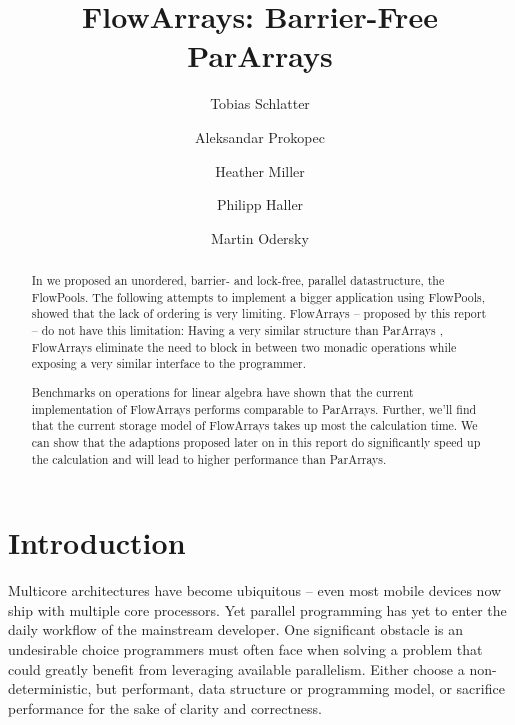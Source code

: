 \documentclass[runningheads,a4paper,fleqn]{llncs}
\begin{document}
\title{FlowArrays: Barrier-Free ParArrays}
\author{Tobias Schlatter \and Aleksandar Prokopec \and
  Heather Miller \and Philipp Haller \and Martin
  Odersky}



\graphicspath{{figs/}}

\newcommand{\plot}[1]{}

\maketitle

\begin{abstract}
  In \cite{FP12} we proposed an unordered, barrier- and lock-free,
  parallel datastructure, the FlowPools. The following attempts to
  implement a bigger application using FlowPools, showed that the lack
  of ordering is very limiting. FlowArrays -- proposed by this report
  -- do not have this limitation: Having a very similar structure than
  ParArrays \cite{collect11}, FlowArrays eliminate the need to block
  in between two monadic operations while exposing a very similar
  interface to the programmer.

  Benchmarks on operations for linear algebra have shown that the
  current implementation of FlowArrays performs comparable to
  ParArrays. Further, we'll find that the current storage model of
  FlowArrays takes up most the calculation time. We can show that
  the adaptions proposed later on in this report do significantly
  speed up the calculation and will lead to higher performance than
  ParArrays.
\end{abstract}

\section{Introduction}
Multicore architectures have become ubiquitous -- even most mobile devices now
ship with multiple core processors. Yet parallel programming has yet to enter
the daily workflow of the mainstream developer. One significant obstacle is an
undesirable choice programmers must often face when solving a problem that
could greatly benefit from leveraging available parallelism. Either choose a
non-deterministic, but performant, data structure or programming model, or
sacrifice performance for the sake of clarity and correctness.
\end{document}
